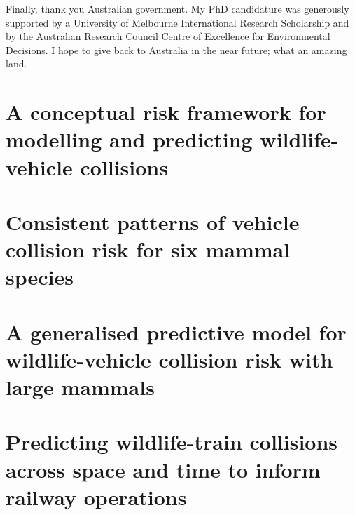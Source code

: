 \documentclass[titlesmallcaps,copyrightpage,examinerscopy]{uomthesis}
\begin{document}
Finally, thank you Australian government. My PhD candidature was generously supported by a University of Melbourne International Research Scholarship and by the Australian Research Council Centre of Excellence for Environmental Decisions. I hope to give back to Australia in the near future; what an amazing land.
\clearpage{\pagestyle{empty}\cleardoublepage}

\tableofcontents
\clearpage{\pagestyle{empty}\cleardoublepage}

\listoffigures
\clearpage{\pagestyle{empty}\cleardoublepage}

\listoftables
\clearpage{\pagestyle{empty}\cleardoublepage}

\mainmatter


\clearpage{\pagestyle{empty}\cleardoublepage}

%
\chapter{A conceptual risk framework for modelling and predicting wildlife-vehicle collisions}\label{sec:egk}
\clearpage{\pagestyle{empty}\cleardoublepage}

%
\chapter{Consistent patterns of vehicle collision risk for six mammal species}\label{sec:6sp}
\clearpage{\pagestyle{empty}\cleardoublepage}

%
\chapter{A generalised predictive model for wildlife-vehicle collision risk with large mammals}\label{sec:cal}
\clearpage{\pagestyle{empty}\cleardoublepage}

%
\chapter{Predicting wildlife-train collisions across space and time to inform railway operations}\label{sec:train}
\clearpage{\pagestyle{empty}\cleardoublepage}
\end{document}
